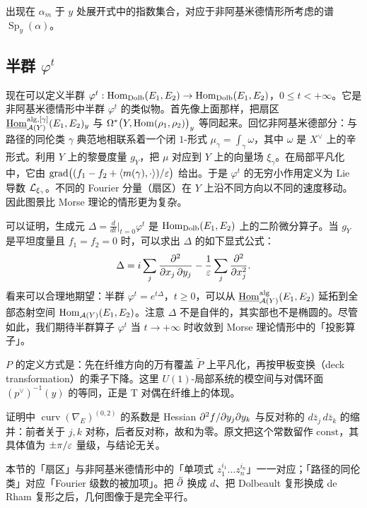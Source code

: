 出现在 $\alpha_m$ 于 $y$ 处展开式中的指数集合，对应于非阿基米德情形所考虑的谱 $\operatorname{Sp}_y(\alpha)$。

\subsection{半群 $\varphi^t$}

现在可以定义半群 $\varphi^t:\operatorname{Hom}_{\mathrm{Dolb}}(E_1,E_2)\to\operatorname{Hom}_{\mathrm{Dolb}}(E_1,E_2)$，$0\le t<+\infty$。它是非阿基米德情形中半群 $\varphi^t$ 的类似物。首先像上面那样，把扇区 $\underline{\operatorname{Hom}}^{\mathrm{alg},[\gamma]}_{\mathcal{A}(Y)}(E_1,E_2)_y$ 与 $\Omega^{*}\bigl(Y,\operatorname{Hom}(\rho_1,\rho_2)\bigr)_y$ 等同起来。回忆非阿基米德部分：与路径的同伦类 $\gamma$ 典范地相联系着一个闭 $1$-形式 $\mu_{\gamma}=\int_{\gamma}\omega$，其中 $\omega$ 是 $X^{\vee}$ 上的辛形式。利用 $Y$ 上的黎曼度量 $g_Y$，把 $\mu$ 对应到 $Y$ 上的向量场 $\xi_{\gamma}$。在局部平凡化中，它由 $\operatorname{grad}\bigl((f_1-f_2+\langle m(\gamma),\cdot\rangle)/\varepsilon\bigr)$ 给出。于是 $\varphi^t$ 的无穷小作用定义为 Lie 导数 $\mathcal{L}_{\xi_{\gamma}}$。不同的 Fourier 分量（扇区）在 $Y$ 上沿不同方向以不同的速度移动。因此图景比 Morse 理论的情形更为复杂。

可以证明，生成元 $\Delta=\frac{d}{dt}\big|_{t=0}\varphi^t$ 是 $\operatorname{Hom}_{\mathrm{Dolb}}(E_1,E_2)$ 上的二阶微分算子。当 $g_Y$ 是平坦度量且 $f_1=f_2=0$ 时，可以求出 $\Delta$ 的如下显式公式：
\[
\Delta=i\sum_j\frac{\partial^2}{\partial x_j\,\partial y_j}-\frac{1}{\varepsilon}\sum_j\frac{\partial^2}{\partial x_j^2}.
\]
看来可以合理地期望：半群 $\varphi^t=e^{t\Delta}$，$t\ge 0$，可以从 $\underline{\operatorname{Hom}}^{\mathrm{alg}}_{\mathcal{A}(Y)}(E_1,E_2)$ 延拓到全部态射空间 $\operatorname{Hom}_{\mathcal{A}(Y)}(E_1,E_2)$。注意 $\Delta$ 不是自伴的，其实部也不是椭圆的。尽管如此，我们期待半群算子 $\varphi^t$ 当 $t\to+\infty$ 时收敛到 Morse 理论情形中的「投影算子」。

\begin{yizhu}[万有丛与平凡化]
$P$ 的定义方式是：先在纤维方向的万有覆盖 $\tilde P$ 上平凡化，再按甲板变换（deck transformation）的乘子下降。这里 $U(1)$-局部系统的模空间与对偶环面 $(p^{\vee})^{-1}(y)$ 的等同，正是 T 对偶在纤维上的体现。
\end{yizhu}

\begin{yizhu}[$(0,2)$-部分为何为零]
证明中 $\operatorname{curv}(\nabla_E)^{(0,2)}$ 的系数是 Hessian $\partial^2f/\partial y_j\partial y_k$ 与反对称的 $d\bar z_j\,d\bar z_k$ 的缩并：前者关于 $j,k$ 对称，后者反对称，故和为零。原文把这个常数留作 $\text{const}$，其具体值为 $\pm\pi/\varepsilon$ 量级，与结论无关。
\end{yizhu}

\begin{yizhu}[与 \S8 的对应]
本节的「扇区」与非阿基米德情形中的「单项式 $z_1^{i_1}\dots z_n^{i_n}$」一一对应；「路径的同伦类」对应「Fourier 级数的被加项」。把 $\bar\partial$ 换成 $d$、把 Dolbeault 复形换成 de Rham 复形之后，几何图像于是完全平行。
\end{yizhu}
